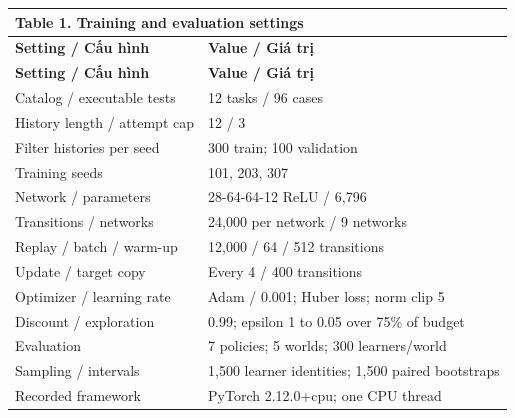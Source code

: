 \documentclass[preprint,11pt,authoryear]{elsarticle}
\begin{document}
\begin{longtable}{p{}p{}}

\multicolumn{2}{l}{\textbf{Table 1.} Training and evaluation settings}\\

\toprule

\textbf{Setting / Cấu hình} & \textbf{Value / Giá trị}\\\midrule\endfirsthead

\textbf{Setting / Cấu hình} & \textbf{Value / Giá trị}\\\midrule\endhead

\bottomrule\endfoot

Catalog / executable tests & 12 tasks / 96 cases\\

History length / attempt cap & 12 / 3\\

Filter histories per seed & 300 train; 100 validation\\

Training seeds & 101, 203, 307\\

Network / parameters & 28-64-64-12 ReLU / 6,796\\

Transitions / networks & 24,000 per network / 9 networks\\

Replay / batch / warm-up & 12,000 / 64 / 512 transitions\\

Update / target copy & Every 4 / 400 transitions\\

Optimizer / learning rate & Adam / 0.001; Huber loss; norm clip 5\\

Discount / exploration & 0.99; epsilon 1 to 0.05 over 75\% of budget\\

Evaluation & 7 policies; 5 worlds; 300 learners/world\\

Sampling / intervals & 1,500 learner identities; 1,500 paired bootstraps\\

Recorded framework & PyTorch 2.12.0+cpu; one CPU thread\\

\end{longtable}\endgroup
\end{document}
